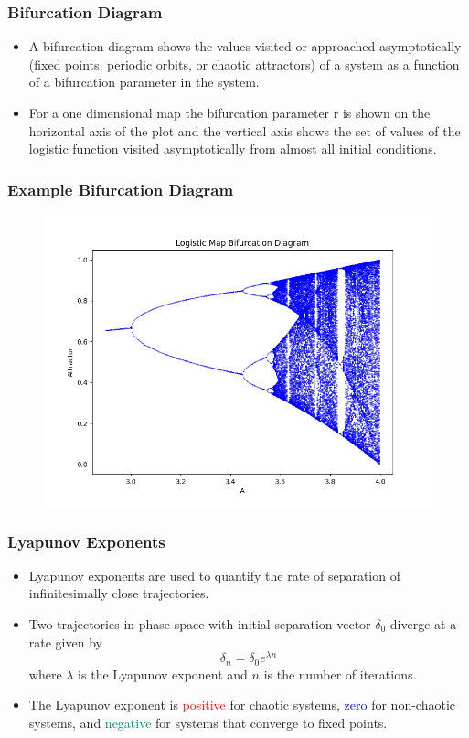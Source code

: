 \documentclass[
	11pt, %
	aspectratio=169, %
]{beamer}
\begin{document}

\begin{frame}
	\frametitle{Bifurcation Diagram}
    \begin{itemize}
        \item A bifurcation diagram shows the values visited or approached asymptotically (fixed points, periodic orbits, or chaotic attractors) of a system as a function of a bifurcation parameter in the system. \pause
        \item For a one dimensional map the bifurcation parameter r is shown on the horizontal axis of the plot and the vertical axis shows the set of values of the logistic function visited asymptotically from almost all initial conditions.
    \end{itemize}
\end{frame}


\begin{frame}
	\frametitle{Example Bifurcation Diagram}
    \begin{figure}
        \includegraphics[width=0.6\linewidth]{logistic_bifurcation_diagram.png}
    \end{figure}
\end{frame}


\begin{frame}
	\frametitle{Lyapunov Exponents}
    \begin{itemize}
        \item Lyapunov exponents are used to quantify the rate of separation of infinitesimally close trajectories. \pause
        \item Two trajectories in phase space with initial separation vector $\delta_0$ diverge at a rate given by 
        \begin{equation}
            \delta_n = \delta_0 e^{\lambda n}
        \end{equation}
        where $\lambda$ is the Lyapunov exponent and $n$ is the number of iterations. \pause
        \item The Lyapunov exponent is \textcolor{red}{positive} for chaotic systems, \textcolor{blue}{zero} for non-chaotic systems, and \textcolor{teal}{negative} for systems that converge to fixed points.
    \end{itemize}
\end{frame}
\end{document}
